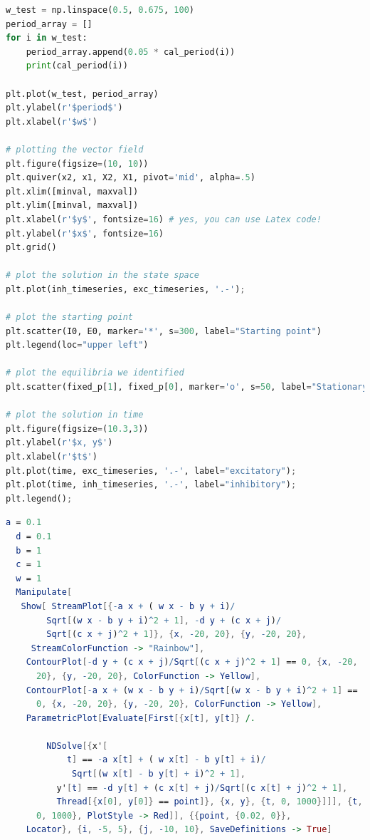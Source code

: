 \documentclass[12pt]{article}
\begin{document}
\begin{lstlisting}[language=Python, caption=Wilson-Cowan Simulation-Python-Run in an IPython Notebook]
w_test = np.linspace(0.5, 0.675, 100)
period_array = []
for i in w_test:
    period_array.append(0.05 * cal_period(i)) 
    print(cal_period(i))
    
plt.plot(w_test, period_array)
plt.ylabel(r'$period$')
plt.xlabel(r'$w$')

# plotting the vector field
plt.figure(figsize=(10, 10))
plt.quiver(x2, x1, X2, X1, pivot='mid', alpha=.5)
plt.xlim([minval, maxval])
plt.ylim([minval, maxval])
plt.xlabel(r'$y$', fontsize=16) # yes, you can use Latex code!
plt.ylabel(r'$x$', fontsize=16)
plt.grid()

# plot the solution in the state space
plt.plot(inh_timeseries, exc_timeseries, '.-');

# plot the starting point
plt.scatter(I0, E0, marker='*', s=300, label="Starting point")
plt.legend(loc="upper left")

# plot the equilibria we identified
plt.scatter(fixed_p[1], fixed_p[0], marker='o', s=50, label="Stationary points")

# plot the solution in time
plt.figure(figsize=(10.3,3))
plt.ylabel(r'$x, y$')
plt.xlabel(r'$t$')
plt.plot(time, exc_timeseries, '.-', label="excitatory");
plt.plot(time, inh_timeseries, '.-', label="inhibitory");
plt.legend();
      \end{lstlisting}

\begin{lstlisting}[language=Mathematica, caption=Wilson-Cowan Simulation-Mathematica]
  a = 0.1
  d = 0.1
  b = 1
  c = 1
  w = 1
  Manipulate[
   Show[ StreamPlot[{-a x + ( w x - b y + i)/
        Sqrt[(w x - b y + i)^2 + 1], -d y + (c x + j)/
        Sqrt[(c x + j)^2 + 1]}, {x, -20, 20}, {y, -20, 20}, 
     StreamColorFunction -> "Rainbow"], 
    ContourPlot[-d y + (c x + j)/Sqrt[(c x + j)^2 + 1] == 0, {x, -20, 
      20}, {y, -20, 20}, ColorFunction -> Yellow], 
    ContourPlot[-a x + (w x - b y + i)/Sqrt[(w x - b y + i)^2 + 1] == 
      0, {x, -20, 20}, {y, -20, 20}, ColorFunction -> Yellow], 
    ParametricPlot[Evaluate[First[{x[t], y[t]} /.
        
        NDSolve[{x'[
            t] == -a x[t] + ( w x[t] - b y[t] + i)/
             Sqrt[(w x[t] - b y[t] + i)^2 + 1], 
          y'[t] == -d y[t] + (c x[t] + j)/Sqrt[(c x[t] + j)^2 + 1], 
          Thread[{x[0], y[0]} == point]}, {x, y}, {t, 0, 1000}]]], {t, 
      0, 1000}, PlotStyle -> Red]], {{point, {0.02, 0}}, 
    Locator}, {i, -5, 5}, {j, -10, 10}, SaveDefinitions -> True]
  \end{lstlisting}
  
\end{document}
